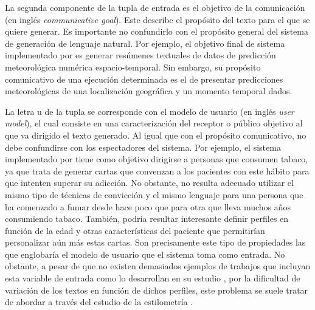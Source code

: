 La segunda componente de la tupla de entrada es el objetivo de la comunicación (en inglés \textit{communicative goal}). Este describe el propósito del texto para el que se quiere generar. Es importante no confundirlo con el propósito general del sistema de generación de lenguaje natural. Por ejemplo, el objetivo final de sistema implementado por \cite{turner2007selecting} es generar resúmenes textuales de datos de predicción meteorológica numérica espacio-temporal. Sin embargo, su propósito comunicativo de una ejecución determinada es el de presentar predicciones meteorológicas de una localización geográfica y un momento temporal dados.

La letra u de la tupla se corresponde con el modelo de usuario (en inglés \textit{user model}), el cual consiste en una caracterización del receptor o público objetivo al que va dirigido el texto generado. Al igual que con el propósito comunicativo, no debe confundirse con los espectadores del sistema. Por ejemplo, el sistema implementado por \cite{reiter1999types} tiene como objetivo dirigirse a personas que consumen tabaco, ya que trata de generar cartas que convenzan a los pacientes con este hábito para que intenten superar su adicción. No obstante, no resulta adecuado utilizar el mismo tipo de técnicas de convicción y el mismo lenguaje para una persona que ha comenzado a fumar desde hace poco que para otra que lleva muchos años consumiendo tabaco. También, podría resultar interesante definir perfiles en función de la edad y otras características del paciente que permitirían personalizar aún más estas cartas. Son precisamente este tipo de propiedades las que englobaría el modelo de usuario que el sistema toma como entrada. No obstante, a pesar de que no existen demasiados ejemplos de trabajos que incluyan esta variable de entrada como lo desarrollan en su estudio \cite{goldberg1994fog}, por la dificultad de variación de los textos en función de dichos perfiles, este problema se suele tratar de abordar a través del estudio de la estilometría \citep{mitfg}.

